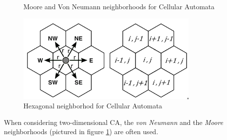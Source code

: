 \begin{figure}
  \centering
  \hspace{1cm}%
  \caption{Moore and Von Neumann neighborhoods for Cellular Automata}
  \label{fig:2d_n}
\end{figure}

\begin{figure}
  \centering
    \includegraphics[width=0.8\textwidth]{hex_n}%
    
  \caption{Hexagonal neighborhod for Cellular Automata\cite{hex_phy}}
  \label{fig:hex_n}
\end{figure}

When considering two-dimensional CA, the \textit{von Neumann} and the \textit{Moore} neighborhoods (pictured in figure \ref{fig:2d_n}) are often used.

